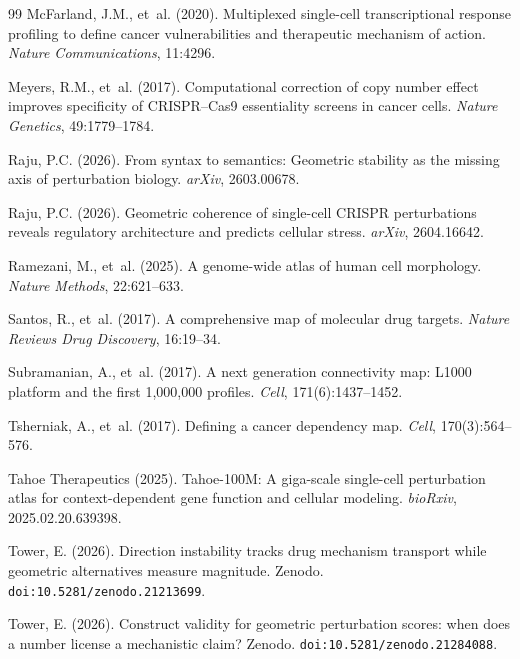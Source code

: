 \documentclass[11pt]{article}
\begin{document}
\begin{thebibliography}{99}
McFarland, J.M., et~al. (2020).
Multiplexed single-cell transcriptional response profiling to define cancer vulnerabilities and therapeutic mechanism of action.
\textit{Nature Communications}, 11:4296.

Meyers, R.M., et~al. (2017).
Computational correction of copy number effect improves specificity of CRISPR--Cas9 essentiality screens in cancer cells.
\textit{Nature Genetics}, 49:1779--1784.

Raju, P.C. (2026).
From syntax to semantics: Geometric stability as the missing axis of perturbation biology.
\textit{arXiv}, 2603.00678.

Raju, P.C. (2026).
Geometric coherence of single-cell CRISPR perturbations reveals regulatory architecture and predicts cellular stress.
\textit{arXiv}, 2604.16642.

Ramezani, M., et~al. (2025).
A genome-wide atlas of human cell morphology.
\textit{Nature Methods}, 22:621--633.

Santos, R., et~al. (2017).
A comprehensive map of molecular drug targets.
\textit{Nature Reviews Drug Discovery}, 16:19--34.

Subramanian, A., et~al. (2017).
A next generation connectivity map: L1000 platform and the first 1,000,000 profiles.
\textit{Cell}, 171(6):1437--1452.

Tsherniak, A., et~al. (2017).
Defining a cancer dependency map.
\textit{Cell}, 170(3):564--576.

Tahoe Therapeutics (2025).
Tahoe-100M: A giga-scale single-cell perturbation atlas for context-dependent gene function and cellular modeling.
\textit{bioRxiv}, 2025.02.20.639398.

Tower, E. (2026).
Direction instability tracks drug mechanism transport while geometric alternatives measure magnitude.
Zenodo. \texttt{doi:10.5281/zenodo.21213699}.

Tower, E. (2026).
Construct validity for geometric perturbation scores: when does a number license a mechanistic claim?
Zenodo. \texttt{doi:10.5281/zenodo.21284088}.

\end{thebibliography}
\end{document}
